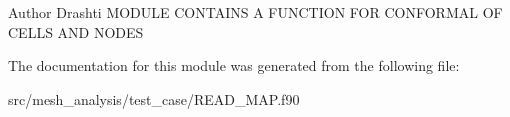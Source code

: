 \begin{DoxyAuthor}{Author}
Drashti M\-O\-D\-U\-L\-E C\-O\-N\-T\-A\-I\-N\-S A F\-U\-N\-C\-T\-I\-O\-N F\-O\-R C\-O\-N\-F\-O\-R\-M\-A\-L O\-F C\-E\-L\-L\-S A\-N\-D N\-O\-D\-E\-S 
\end{DoxyAuthor}


The documentation for this module was generated from the following file\-:\begin{DoxyCompactItemize}
\item 
src/mesh\-\_\-analysis/test\-\_\-case/R\-E\-A\-D\-\_\-\-M\-A\-P.\-f90\end{DoxyCompactItemize}

